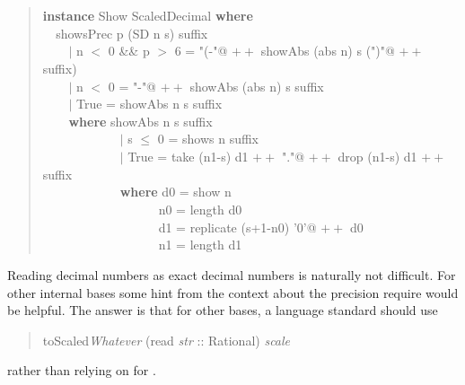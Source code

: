 \documentclass[prodmode,acmtoplas]{acmsmall}
\begin{document}
\begin{quote}
\begin{tabbing}
\sffamily \textbf{instance} Show ScaledDecimal \textbf{where}\\
\verb|  |\sffamily  showsPrec p (SD n s) suffix\\
\verb|    |\sffamily    $|$ n $<$ 0 \&\& p $>$ 6 = \verb@"(-"@ $+\!\!+$ showAbs (abs n) s (\verb@")"@ $+\!\!+$ suffix)\\
\verb|    |\sffamily    $|$ n $<$ 0          =  \verb@"-"@ $+\!\!+$ showAbs (abs n) s suffix\\
\verb|    |\sffamily    $|$ True           =         showAbs      n  s suffix\\
\verb|    |\sffamily    \textbf{where} showAbs n s suffix\\
\verb|            |\sffamily            $|$ s $\le$ 0 = shows n suffix\\
\verb|            |\sffamily            $|$ True = take (n1-s) d1 $+\!\!+$ \verb@"."@ $+\!\!+$ drop (n1-s) d1 $+\!\!+$ suffix\\
\verb|            |\sffamily            \textbf{where} d0  = show n\\
\verb|                  |\sffamily                  n0 = length d0\\
\verb|                  |\sffamily                  d1 = replicate (s+1-n0) \verb@'0'@ $+\!\!+$ d0\\
\verb|                  |\sffamily                  n1 = length d1
\end{tabbing}
\end{quote}

Reading decimal numbers as exact decimal numbers is naturally not
difficult.  For other internal bases some hint from the context about
the precision require would be helpful.  The answer is that for other
bases, a language standard should use
\begin{quote}
\sffamily toScaled\textit{Whatever} (read \textit{str} :: Rational) %
\textit{scale}
\end{quote}
rather than relying on  for .
\end{document}
